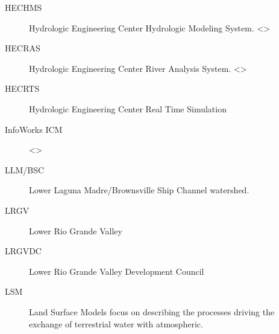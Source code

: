 \documentclass[letterpaper,12pt,english]{book}
\begin{document}
\begin{description}
\item[{HEC\sphinxhyphen{}HMS\label{\detokenize{glossary:term-HEC-HMS}}}] \leavevmode
\sphinxAtStartPar
Hydrologic Engineering Center Hydrologic Modeling System. \textless{}\textgreater{}

\item[{HEC\sphinxhyphen{}RAS\label{\detokenize{glossary:term-HEC-RAS}}}] \leavevmode
\sphinxAtStartPar
Hydrologic Engineering Center River Analysis System.  \textless{}\textgreater{}

\item[{HEC\sphinxhyphen{}RTS\label{\detokenize{glossary:term-HEC-RTS}}}] \leavevmode
\sphinxAtStartPar
Hydrologic Engineering Center Real Time Simulation

\item[{InfoWorks ICM\label{\detokenize{glossary:term-InfoWorks-ICM}}}] \leavevmode
\sphinxAtStartPar
\textless{}\textgreater{}

\item[{LLM/BSC\label{\detokenize{glossary:term-LLM-BSC}}}] \leavevmode
\sphinxAtStartPar
Lower Laguna Madre/Brownsville Ship Channel watershed.

\item[{LRGV\label{\detokenize{glossary:term-LRGV}}}] \leavevmode
\sphinxAtStartPar
Lower Rio Grande Valley

\item[{LRGVDC\label{\detokenize{glossary:term-LRGVDC}}}] \leavevmode
\sphinxAtStartPar
Lower Rio Grande Valley Development Council

\item[{LSM\label{\detokenize{glossary:term-LSM}}}] \leavevmode
\sphinxAtStartPar
Land Surface Models focus on describing the processes driving the exchange of terrestrial water with atmospheric.


\end{description}
\end{document}
